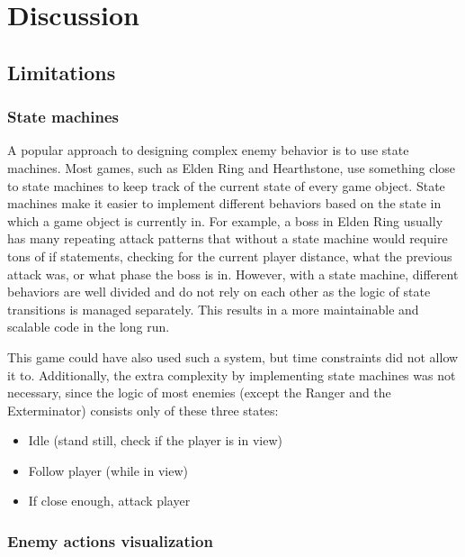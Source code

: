 \chapter{Discussion} \label{Chapter:Discussion}



\section{Limitations}



\subsection{State machines}

A popular approach to designing complex enemy behavior is to use state machines. Most games, such as Elden Ring\cite{eldenRing2022} and Hearthstone\cite{hearthstone2014}, use something close to state machines to keep track of the current state of every game object. State machines make it easier to implement different behaviors based on the state in which a game object is currently in. For example, a boss in Elden Ring\cite{eldenRing2022} usually has many repeating attack patterns that without a state machine would require tons of if statements, checking for the current player distance, what the previous attack was, or what phase the boss is in. However, with a state machine, different behaviors are well divided and do not rely on each other as the logic of state transitions is managed separately. This results in a more maintainable and scalable code in the long run.

This game could have also used such a system, but time constraints did not allow it to. Additionally, the extra complexity by implementing state machines was not necessary, since the logic of most enemies (except the Ranger and the Exterminator) consists only of these three states:

\begin{itemize}
  \item Idle (stand still, check if the player is in view)
  \item Follow player (while in view)
  \item If close enough, attack player
\end{itemize}



\subsection{Enemy actions visualization}

